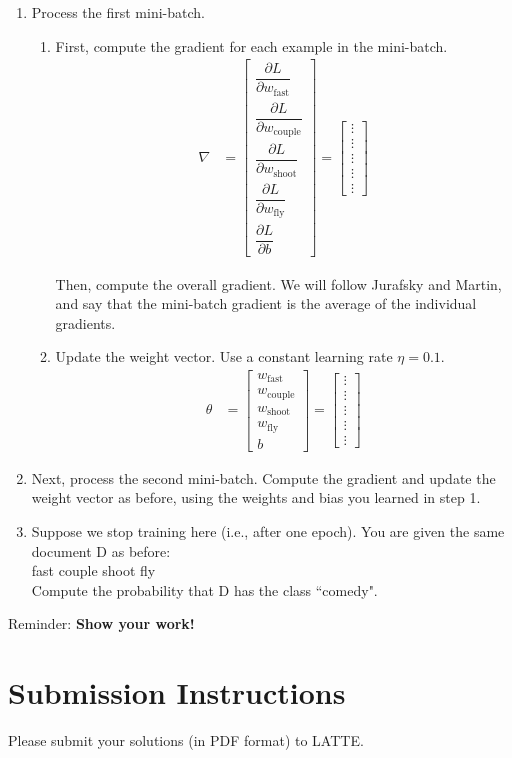 \documentclass[11pt,letterpaper]{article}
\begin{document}
\begin{enumerate}
\item Process the first mini-batch.
\begin{enumerate}
\item First, compute the gradient for each example in the mini-batch.
\begin{align*}
\nabla &= \begin{bmatrix}
\dfrac{\partial L}{\partial w_\mathrm{fast}} \\[11pt]
\dfrac{\partial L}{\partial w_\mathrm{couple}} \\[11pt]
\dfrac{\partial L}{\partial w_\mathrm{shoot}} \\[11pt]
\dfrac{\partial L}{\partial w_\mathrm{fly}} \\[11pt]
\dfrac{\partial L}{\partial b}
\end{bmatrix} = \begin{bmatrix}
\vdots \\[11pt]
\vdots \\[11pt]
\vdots \\[11pt]
\vdots \\[11pt]
\vdots
\end{bmatrix}
\end{align*}

Then, compute the overall gradient. We will follow Jurafsky and Martin, and say that the mini-batch gradient is the average of the individual gradients.
\item Update the weight vector. Use a constant learning rate $\eta=0.1$.
\begin{align*}
\theta &= \begin{bmatrix}
w_\mathrm{fast} \\[7pt]
w_\mathrm{couple} \\[7pt]
w_\mathrm{shoot} \\[7pt]
w_\mathrm{fly} \\[7pt]
b
\end{bmatrix} = \begin{bmatrix}
\vdots \\
\vdots \\
\vdots \\
\vdots \\
\vdots
\end{bmatrix}
\end{align*}

\end{enumerate}
\item Next, process the second mini-batch. Compute the gradient and update the weight vector as before, using the weights and bias you learned in step 1.
\item Suppose we stop training here (i.e., after one epoch). You are given the same document D as before:\\

\hspace{22pt}fast couple shoot fly\\

Compute the probability that D has the class ``comedy".
\end{enumerate}

\noindent Reminder: \textbf{Show your work!}

\section*{Submission Instructions}

Please submit your solutions (in PDF format) to LATTE.
\end{document}
